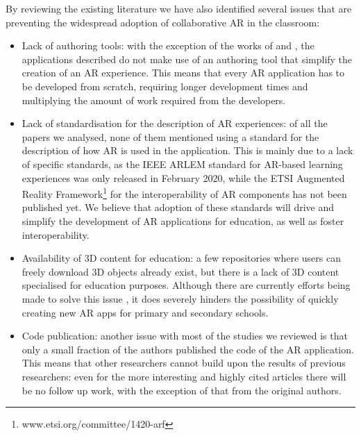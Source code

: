 By reviewing the existing literature we have also identified several issues that are preventing the widespread adoption of collaborative \gls{AR} in the classroom:
\begin{itemize}
    \item Lack of authoring tools: with the exception of the works of \cite{lytridis2018artutor} and \cite{whitlock2020mrcat}, the applications described do not make use of an authoring tool that simplify the creation of an AR experience. This means that every AR application has to be developed from scratch, requiring longer development times and multiplying the amount of work required from the developers.
    \item Lack of standardisation for the description of AR experiences: of all the papers we analysed, none of them mentioned using a standard for the description of how AR is used in the application. This is mainly due to a lack of specific standards, as the IEEE ARLEM standard \cite{arlem2020} for AR-based learning experiences was only released in February 2020, while the ETSI Augmented Reality Framework\footnote{www.etsi.org/committee/1420-arf} for the interoperability of AR components has not been published yet. We believe that adoption of these standards will drive and simplify the development of \gls{AR} applications for education, as well as foster interoperability.
    \item Availability of 3D content for education: a few repositories where users can freely download 3D objects already exist, but there is a lack of 3D content specialised for education purposes. Although there are currently efforts being made to solve this issue \cite{masneri2020work}, it does severely hinders the possibility of quickly creating new AR apps for primary and secondary schools.
    \item Code publication: another issue with most of the studies we reviewed is that only a small fraction of the authors published the code of the \gls{AR} application. This means that other researchers cannot build upon the results of previous researchers: even for the more interesting and highly cited articles there will be no follow up work, with the exception of that from the original authors.
\end{itemize}

